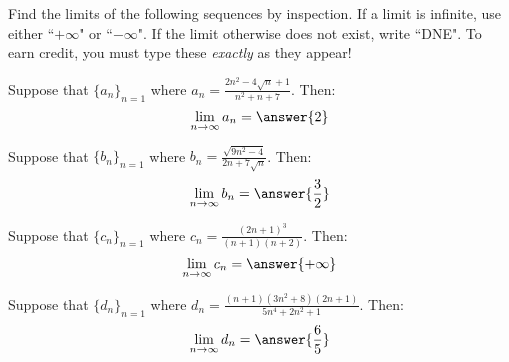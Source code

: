 \documentclass{ximera}
\author{Jim Talamo}
\begin{document}
\begin{exercise}

Find the limits of the following sequences by inspection.  If a limit is infinite, use either ``$+\infty$" or ``$-\infty$".  If the limit otherwise does not exist, write ``DNE".  To earn credit, you must type these \emph{exactly} as they appear!

\begin{exercise}
Suppose that $\{a_n \}_{n=1}$ where $a_n = \frac{2n^2-4\sqrt{n}+1}{n^2+n+7}$.  Then:
\[
\lim_{n \to \infty} a_n = \answer{2}
\]
\end{exercise}

\begin{exercise}
Suppose that $\{b_n \}_{n=1}$ where $b_n = \frac{\sqrt{9n^2-4}}{2n+7\sqrt{n}}$.  Then:
\[
\lim_{n \to \infty} b_n = \answer{\frac{3}{2}}
\]
\end{exercise}

\begin{exercise}
Suppose that $\{c_n \}_{n=1}$ where $c_n = \frac{(2n+1)^3}{(n+1)(n+2)}$.  Then:
\[
\lim_{n \to \infty} c_n = \answer{+\infty}
\]
\end{exercise}

\begin{exercise}
Suppose that $\{d_n \}_{n=1}$ where $d_n = \frac{(n+1)(3n^2+8)(2n+1)}{5n^4+2n^2+1}$.  Then:
\[
\lim_{n \to \infty} d_n = \answer{\frac{6}{5}}
\]
\end{exercise}


\end{exercise}
\end{document}
